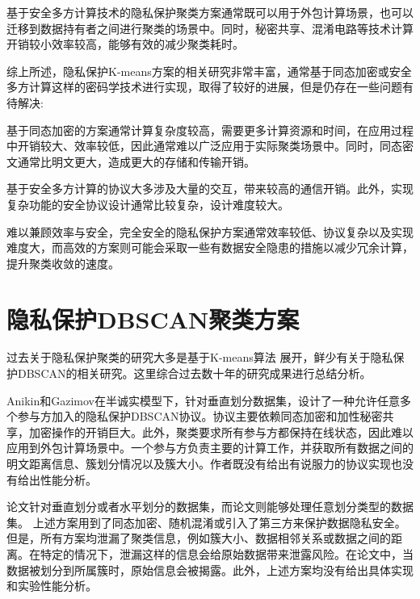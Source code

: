 基于安全多方计算技术的隐私保护聚类方案通常既可以用于外包计算场景，也可以迁移到数据持有者之间进行聚类的场景中。同时，秘密共享、混淆电路等技术计算开销较小效率较高，能够有效的减少聚类耗时。

综上所述，隐私保护K-means方案的相关研究非常丰富，通常基于同态加密或安全多方计算这样的密码学技术进行实现，取得了较好的进展，但是仍存在一些问题有待解决:
\begin{compactitem}
	\item 基于同态加密的方案通常计算复杂度较高，需要更多计算资源和时间，在应用过程中开销较大、效率较低，因此通常难以广泛应用于实际聚类场景中。同时，同态密文通常比明文更大，造成更大的存储和传输开销。
	\item 基于安全多方计算的协议大多涉及大量的交互，带来较高的通信开销。此外，实现复杂功能的安全协议设计通常比较复杂，设计难度较大。
	\item 难以兼顾效率与安全，完全安全的隐私保护方案通常效率较低、协议复杂以及实现难度大，而高效的方案则可能会采取一些有数据安全隐患的措施以减少冗余计算，提升聚类收敛的速度。
\end{compactitem}

\section{隐私保护DBSCAN聚类方案}
过去关于隐私保护聚类的研究大多是基于K-means算法  展开，鲜少有关于隐私保护DBSCAN的相关研究。这里综合过去数十年的研究成果进行总结分析。

Anikin和Gazimov\cite{anikin2017privacy}在半诚实模型下，针对垂直划分数据集，设计了一种允许任意多个参与方加入的隐私保护DBSCAN协议。协议主要依赖同态加密和加性秘密共享，加密操作的开销巨大。此外，聚类要求所有参与方都保持在线状态，因此难以应用到外包计算场景中。一个参与方负责主要的计算工作，并获取所有数据之间的明文距离信息、簇划分情况以及簇大小。作者既没有给出有说服力的协议实现也没有给出性能分析。

论文\cite{2006Privacy,jiang2008privacy,kumar2007privacy,liu2012privacy,xu2007protocols}针对垂直划分或者水平划分的数据集，而论文\cite{almutairi2018secure,liu2012privacy}则能够处理任意划分类型的数据集。
上述方案用到了同态加密、随机混淆或引入了第三方来保护数据隐私安全。但是，所有方案均泄漏了聚类信息，例如簇大小、数据相邻关系\cite{almutairi2018secure,jiang2008privacy,kumar2007privacy,liu2012privacy,rahman2017towards}或数据之间的距离\cite{2006Privacy}。在特定的情况下，泄漏这样的信息会给原始数据带来泄露风险\cite{kumar2007privacy,liu2012privacy}。在论文\cite{xu2007protocols}中，当数据被划分到所属簇时，原始信息会被揭露。此外，上述方案均没有给出具体实现和实验性能分析。

